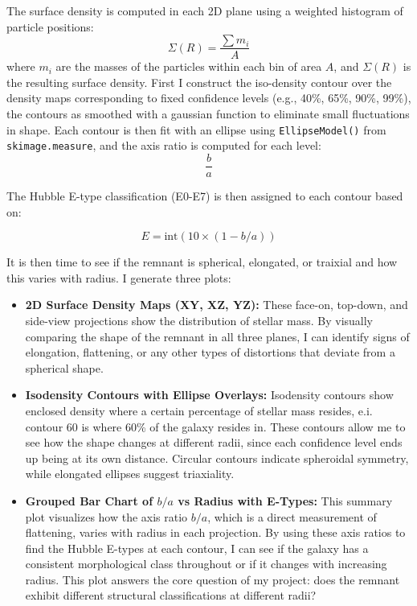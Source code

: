\documentclass[usenatbib]{mnras}
\begin{document}
The surface density is computed in each 2D plane using a weighted histogram of particle positions:
\[
\Sigma(R) = \frac{\sum m_i}{A}
\]
where \( m_i \) are the masses of the particles within each bin of area \( A \), and \( \Sigma(R) \) is the resulting surface density. First I construct the iso-density contour over the density maps corresponding to fixed confidence levels (e.g., 40\%, 65\%, 90\%, 99\%), the contours as smoothed with a gaussian function to eliminate small fluctuations in shape. Each contour is then fit with an ellipse using \texttt{EllipseModel()} from \texttt{skimage.measure}, and the axis ratio is computed for each level:
\[
\frac{b}{a}
\]

The Hubble E-type classification (E0-E7) is then assigned to each contour based on:

\[
E = \text{int}(10 \times (1 - b/a))
\]

It is then time to see if the remnant is spherical, elongated, or traixial and how this varies with radius. I generate three plots:

\begin{itemize}
    \item \textbf{2D Surface Density Maps (XY, XZ, YZ):}  
    These face-on, top-down, and side-view projections show the distribution of stellar mass. By visually comparing the shape of the remnant in all three planes, I can identify signs of elongation, flattening, or any other types of distortions that deviate from a spherical shape. 

    \item \textbf{Isodensity Contours with Ellipse Overlays:}  
    Isodensity contours show enclosed density where a certain percentage of stellar mass resides, e.i. contour 60 is where 60\% of the galaxy resides in. These contours allow me to see how the shape changes at different radii, since each confidence level ends up being at its own distance. Circular contours indicate spheroidal symmetry, while elongated ellipses suggest triaxiality.

    \item \textbf{Grouped Bar Chart of \( b/a \) vs Radius with E-Types:}  
    This summary plot visualizes how the axis ratio \( b/a \), which is a direct measurement of flattening, varies with radius in each projection. By using these axis ratios to find the Hubble E-types at each contour, I can see if the galaxy has a consistent morphological class throughout or if it changes with increasing radius. This plot answers the core question of my project: does the remnant exhibit different structural classifications at different radii?
\end{itemize}
\end{document}
